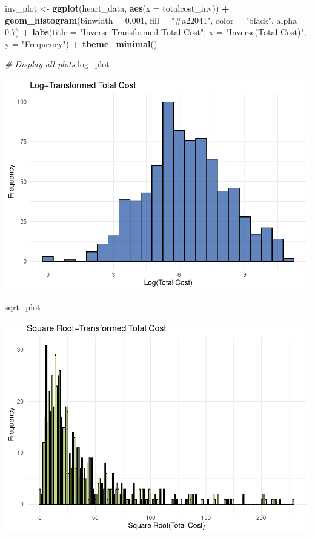 \documentclass[
]{article}
\newenvironment{Shaded}{\begin{snugshade}}{\end{snugshade}}
\newcommand{\AttributeTok}[1]{\textcolor[rgb]{0.13,0.29,0.53}{#1}}
\newcommand{\CommentTok}[1]{\textcolor[rgb]{0.56,0.35,0.01}{\textit{#1}}}
\newcommand{\FloatTok}[1]{\textcolor[rgb]{0.00,0.00,0.81}{#1}}
\newcommand{\FunctionTok}[1]{\textcolor[rgb]{0.13,0.29,0.53}{\textbf{#1}}}
\newcommand{\NormalTok}[1]{#1}
\newcommand{\OtherTok}[1]{\textcolor[rgb]{0.56,0.35,0.01}{#1}}
\newcommand{\SpecialCharTok}[1]{\textcolor[rgb]{0.81,0.36,0.00}{\textbf{#1}}}
\newcommand{\StringTok}[1]{\textcolor[rgb]{0.31,0.60,0.02}{#1}}
\begin{document}
\begin{Shaded}
\begin{Highlighting}[]
\NormalTok{inv\_plot }\OtherTok{\textless{}{-}} \FunctionTok{ggplot}\NormalTok{(heart\_data, }\FunctionTok{aes}\NormalTok{(}\AttributeTok{x =}\NormalTok{ totalcost\_inv)) }\SpecialCharTok{+}
  \FunctionTok{geom\_histogram}\NormalTok{(}\AttributeTok{binwidth =} \FloatTok{0.001}\NormalTok{, }\AttributeTok{fill =} \StringTok{"\#a22041"}\NormalTok{, }\AttributeTok{color =} \StringTok{"black"}\NormalTok{, }\AttributeTok{alpha =} \FloatTok{0.7}\NormalTok{) }\SpecialCharTok{+}
  \FunctionTok{labs}\NormalTok{(}\AttributeTok{title =} \StringTok{"Inverse{-}Transformed Total Cost"}\NormalTok{, }\AttributeTok{x =} \StringTok{"Inverse(Total Cost)"}\NormalTok{, }\AttributeTok{y =} \StringTok{"Frequency"}\NormalTok{) }\SpecialCharTok{+}
  \FunctionTok{theme\_minimal}\NormalTok{()}

\CommentTok{\# Display all plots}
\NormalTok{log\_plot}
\end{Highlighting}
\end{Shaded}

\includegraphics{p8130_hw4_xx2485_files/figure-latex/unnamed-chunk-11-1.pdf}

\begin{Shaded}
\begin{Highlighting}[]
\NormalTok{sqrt\_plot}
\end{Highlighting}
\end{Shaded}

\includegraphics{p8130_hw4_xx2485_files/figure-latex/unnamed-chunk-11-2.pdf}
\end{document}
